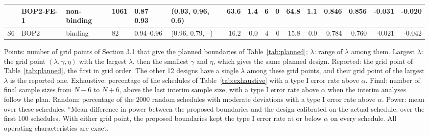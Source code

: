 \begin{table}
\begin{tabular}{llllllrrrrrrrrrr}
 & BOP2-FE-1 & non-binding & 1061 & 0.87--0.93 & (0.93, 0.96, 0.6) & 63.6 & 1.4 & 6 & 0 & 64.8 & 1.1 & 0.846 & 0.856 & -0.031 & -0.020 \\
\midrule
S6 & BOP2 & binding & 82 & 0.94--0.96 & (0.96, 0.79, --) & 16.2 & 0.0 & 4 & 0 & 15.8 & 0.0 & 0.784 & 0.760 & -0.021 & -0.042 \\
\bottomrule
\end{tabular}
\par\medskip
\begin{minipage}{0.95\textwidth}
\footnotesize
Points: number of grid points of Section 3.1 that give the planned boundaries of Table~\ref{tab:planned}; $\lambda$: range of $\lambda$ among them. Largest $\lambda$: the grid point $(\lambda, \gamma, \eta)$ with the largest $\lambda$, then the smallest $\gamma$ and $\eta$, which gives the same planned design. Reported: the grid point of Table~\ref{tab:planned}, the first in grid order. The other 12 designs have a single $\lambda$ among these grid points, and their grid point of the largest $\lambda$ is the reported one. Exhaustive: percentage of the schedules of Table~\ref{tab:exhaustive} with a type I error rate above $\alpha$. Final: number of final sample sizes from $N - 6$ to $N + 6$, above the last interim sample size, with a type I error rate above $\alpha$ when the interim analyses follow the plan. Random: percentage of the 2000 random schedules with moderate deviations with a type I error rate above $\alpha$. Power: mean over these schedules. $^{a}$Mean difference in power between the proposed boundaries and the design calibrated on the actual schedule, over the first 100 schedules. With either grid point, the proposed boundaries kept the type I error rate at or below $\alpha$ on every schedule. All operating characteristics are exact.
\end{minipage}
\end{table}
